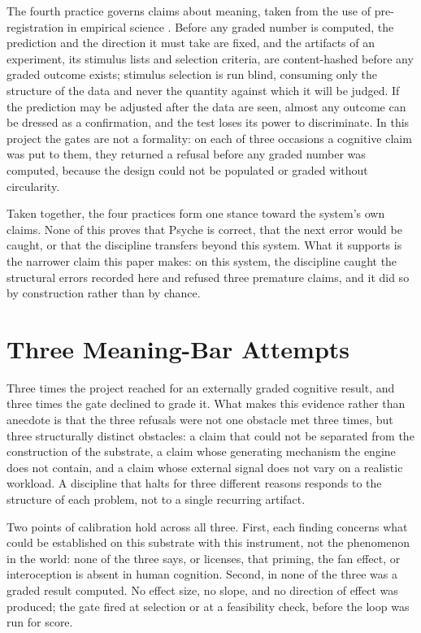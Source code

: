 \documentclass[conference]{IEEEtran}
\begin{document}
The fourth practice governs claims about meaning, taken from the use of pre-registration in
empirical science \cite{nosek2018preregistration}. Before any graded number is computed, the
prediction and the direction it must take are fixed, and the artifacts of an experiment, its
stimulus lists and selection criteria, are content-hashed before any graded outcome exists;
stimulus selection is run blind, consuming only the structure of the data and never the
quantity against which it will be judged. If the prediction may be adjusted after the data are
seen, almost any outcome can be dressed as a confirmation, and the test loses its power to
discriminate. In this project the gates are not a formality: on each of three occasions a
cognitive claim was put to them, they returned a refusal before any graded number was
computed, because the design could not be populated or graded without circularity.

Taken together, the four practices form one stance toward the system's own claims. None of
this proves that Psyche is correct, that the next error would be caught, or that the
discipline transfers beyond this system. What it supports is the narrower claim this paper
makes: on this system, the discipline caught the structural errors recorded here and refused
three premature claims, and it did so by construction rather than by chance.

\section{Three Meaning-Bar Attempts}\label{sec:attempts}
Three times the project reached for an externally graded cognitive result, and three times
the gate declined to grade it. What makes this evidence rather than anecdote is that the
three refusals were not one obstacle met three times, but three structurally distinct
obstacles: a claim that could not be separated from the construction of the substrate, a
claim whose generating mechanism the engine does not contain, and a claim whose external
signal does not vary on a realistic workload. A discipline that halts for three different
reasons responds to the structure of each problem, not to a single recurring artifact.

Two points of calibration hold across all three. First, each finding concerns what could be
established on this substrate with this instrument, not the phenomenon in the world: none of
the three says, or licenses, that priming, the fan effect, or interoception is absent in
human cognition. Second, in none of the three was a graded result computed. No effect size,
no slope, and no direction of effect was produced; the gate fired at selection or at a
feasibility check, before the loop was run for score.
\end{document}
